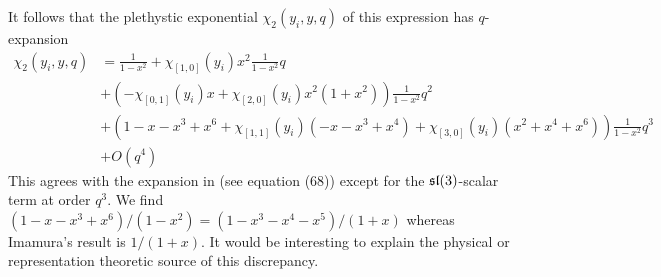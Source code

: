 It follows that the plethystic exponential $\chi_2(y_i,y,q)$ of this expression has $q$-expansion
\begin{align*}
\chi_2(y_i,y,q) & = \frac{1}{1-x^2} + \chi_{[1,0]}(y_i) x^2 \frac{1}{1-x^2} q \\
& + \left(-\chi_{[0,1]}(y_i) x + \chi_{[2,0]}(y_i) x^2 (1+x^2)\right) \frac{1}{1-x^2} q^2 \\ 
& + \left( 1 - x - x^3 + x^6 + \chi_{[1,1]}(y_i) (-x - x^3 + x^4) + \chi_{[3,0]}(y_i) (x^2 + x^4 + x^6) \right) \frac{1}{1-x^2} q^3 \\
& + O(q^4) 
\end{align*}
This agrees with the expansion in \cite{Imamura} (see equation (68)) except for the $\mathfrak{sl}(3)$-scalar term at order $q^3$. 
We find $(1-x-x^3+x^6) / (1-x^2) = (1-x^3-x^4-x^5) / (1+x)$ whereas Imamura's result is $1 / (1+x)$. 
It would be interesting to explain the physical or representation theoretic source of this discrepancy.


